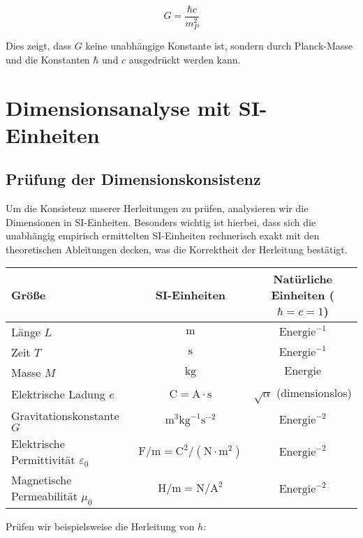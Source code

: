 \documentclass{article}
\begin{document}
	\begin{equation}
		G = \frac{\hbar c}{m_P^2}
	\end{equation}
	
	Dies zeigt, dass $G$ keine unabhängige Konstante ist, sondern durch Planck-Masse und die Konstanten $\hbar$ und $c$ ausgedrückt werden kann.
	
	\section{Dimensionsanalyse mit SI-Einheiten}
	
	\subsection{Prüfung der Dimensionskonsistenz}
	
	Um die Konsistenz unserer Herleitungen zu prüfen, analysieren wir die Dimensionen in SI-Einheiten. Besonders wichtig ist hierbei, dass sich die unabhängig empirisch ermittelten SI-Einheiten rechnerisch exakt mit den theoretischen Ableitungen decken, was die Korrektheit der Herleitung bestätigt.
	
	\begin{center}
		\begin{tabular}{|l|c|c|}
			\hline
			\textbf{Größe} & \textbf{SI-Einheiten} & \textbf{Natürliche Einheiten} ($\hbar = c = 1$) \\
			\hline
			Länge $L$ & $\text{m}$ & $\text{Energie}^{-1}$ \\
			Zeit $T$ & $\text{s}$ & $\text{Energie}^{-1}$ \\
			Masse $M$ & $\text{kg}$ & $\text{Energie}$ \\
			Elektrische Ladung $e$ & $\text{C} = \text{A} \cdot \text{s}$ & $\sqrt{\alpha}$ (dimensionslos) \\
			Gravitationskonstante $G$ & $\text{m}^3 \text{kg}^{-1} \text{s}^{-2}$ & $\text{Energie}^{-2}$ \\
			Elektrische Permittivität $\varepsilon_0$ & $\text{F/m} = \text{C}^2/(\text{N} \cdot \text{m}^2)$ & $\text{Energie}^{-2}$ \\
			Magnetische Permeabilität $\mu_0$ & $\text{H/m} = \text{N}/\text{A}^2$ & $\text{Energie}^{-2}$ \\
			\hline
		\end{tabular}
	\end{center}
	
	Prüfen wir beispielsweise die Herleitung von $h$:
	
\end{document}

